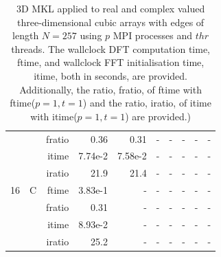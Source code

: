 \documentclass[a4paper]{article}
\begin{document}
\begin{table}[htbp]
\begin{center}
\begin{small}
\begin{tabular}{|r|r|r|r|r|r|r|r|r|r|}
             &             &  fratio &    0.36 &   0.31 &      - &      - &      - &      - &      - \\
             &             &  itime &    7.74e-2 &    7.58e-2 &      - &      - &      - &      - &      - \\
             &             &  iratio &    21.9 &   21.4 &     - &      - &      - &      - &      - \\\hline
   16 &   C &  ftime &    3.83e-1 &      - &      - &      - &      - &      - &      - \\
             &             &  fratio &   0.31 &      - &      - &      - &      - &      - &      - \\
             &             &  itime &    8.93e-2 &      - &      - &      - &      - &      - &      - \\
             &             &  iratio &    25.2 &     - &      - &      - &      - &      - &      - \\\hline
\end{tabular}
\caption{3D MKL applied to real and complex valued three-dimensional cubic arrays with edges of length $N=257$ using $p$ MPI processes and $thr$ threads. The wallclock DFT computation time, ftime, and wallclock FFT initialisation time, itime, both in seconds, are provided. Additionally, the ratio, fratio, of ftime  with ftime($p=1,t=1$) and the ratio, iratio, of itime  with itime($p=1,t=1$) are provided.) }\label{Tbl:MKL3d257}
\end{small}
\end{center}
\end{table}
\end{document}
